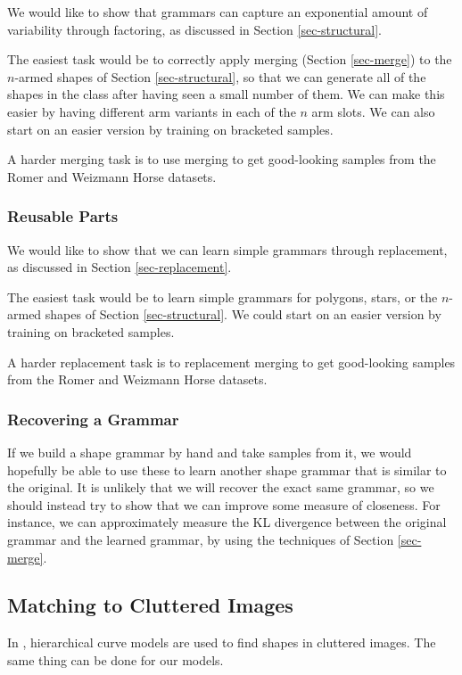 \documentclass{article}
\begin{document}
We would like to show that grammars can capture an exponential amount
of variability through factoring, as discussed in Section
\ref{sec-structural}.

The easiest task would be to correctly apply merging (Section
\ref{sec-merge}) to the $n$-armed shapes of Section
\ref{sec-structural}, so that we can generate all of the shapes in the
class after having seen a small number of them. We can make this
easier by having different arm variants in each of the $n$ arm
slots. We can also start on an easier version by training on bracketed
samples.

A harder merging task is to use merging to get good-looking samples
from the Romer and Weizmann Horse datasets.

\subsubsection{Reusable Parts}

We would like to show that we can learn simple grammars through
replacement, as discussed in Section \ref{sec-replacement}.

The easiest task would be to learn simple grammars for polygons,
stars, or the $n$-armed shapes of Section \ref{sec-structural}. We
could start on an easier version by training on bracketed samples.

A harder replacement task is to replacement merging to get
good-looking samples from the Romer and Weizmann Horse datasets.

\subsubsection{Recovering a Grammar}

If we build a shape grammar by hand and take samples from it, we would
hopefully be able to use these to learn another shape grammar that is
similar to the original. It is unlikely that we will recover the exact
same grammar, so we should instead try to show that we can improve
some measure of closeness. For instance, we can approximately measure
the KL divergence between the original grammar and the learned
grammar, by using the techniques of Section \ref{sec-merge}.

\subsection{Matching to Cluttered Images}

In \cite{hcm}, hierarchical curve models are used to find shapes in
cluttered images. The same thing can be done for our models.
\end{document}
